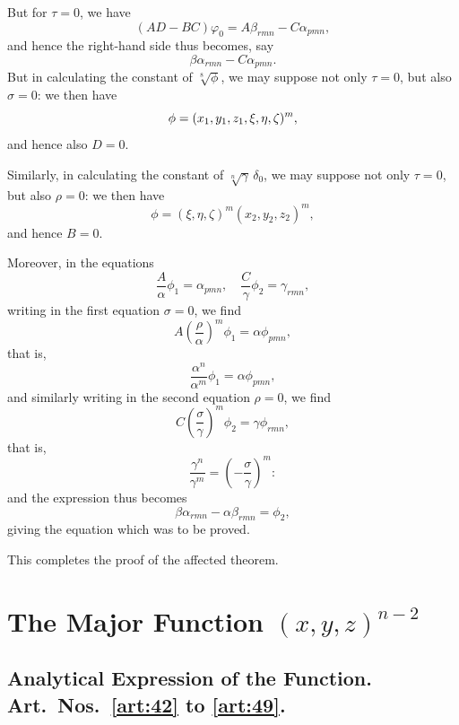 \documentclass[11pt,a4paper]{book}
\begin{document}
\begin{art}\label{art:41}
But for $\tau = 0$, we have
\[
(AD - BC)\varphi_0 = A\beta_{rmn} - C\alpha_{pmn},
\]
and hence the right-hand side thus becomes, say
\[
\beta\alpha_{rmn} - C\alpha_{pmn}.
\]
But in calculating the constant of $\sqrt[8]{\phi}$, we may suppose not only $\tau = 0$, but also $\sigma = 0$: we then have
\[
\phi = (x_1, y_1, z_1 \char`\, \xi, \eta, \zeta)^m,
\]
and hence also $D = 0$.

Similarly, in calculating the constant of $\sqrt[n]{\gamma}\,\delta_0$, we may suppose not only $\tau = 0$, but also $\rho = 0$: we then have
\[
\phi = (\xi, \eta, \zeta)^m (x_2, y_2, z_2)^m,
\]
and hence $B = 0$.

Moreover, in the equations
\[
\frac{A}{\alpha}\phi_1 = \alpha_{pmn}, \quad \frac{C}{\gamma}\phi_2 = \gamma_{rmn},
\]
writing in the first equation $\sigma = 0$, we find
\[
A\left(\frac{\rho}{\alpha}\right)^m \phi_1 = \alpha\phi_{pmn},
\]
that is,
\[
\frac{\alpha^n}{\alpha^m}\phi_1 = \alpha\phi_{pmn},
\]
and similarly writing in the second equation $\rho = 0$, we find
\[
C\left(\frac{\sigma}{\gamma}\right)^m \phi_2 = \gamma\phi_{rmn},
\]
that is,
\[
\frac{\gamma^n}{\gamma^m} = \left(-\frac{\sigma}{\gamma}\right)^m:
\]
and the expression thus becomes
\[
\beta\alpha_{rmn} - \alpha\beta_{rmn} = \phi_2,
\]
giving the equation which was to be proved.

This completes the proof of the affected theorem.
\end{art}

\newpage
\section{The Major Function $(x, y, z)^{n-2}$}

\subsection*{Analytical Expression of the Function. Art.~Nos.~\ref{art:42} to \ref{art:49}.}
\end{document}
